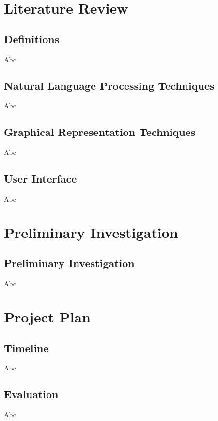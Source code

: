 	\section{Literature Review} \label{sec:litrev}
		\subsection{Definitions}
			Abc
		\subsection{Natural Language Processing Techniques}
			Abc
		\subsection{Graphical Representation Techniques}
			Abc
		\subsection{User Interface}
			Abc
	\section{Preliminary Investigation}
		\subsection{Preliminary Investigation}
			Abc
	\section{Project Plan}
		\subsection{Timeline}
			Abc
		\subsection{Evaluation}
			Abc
